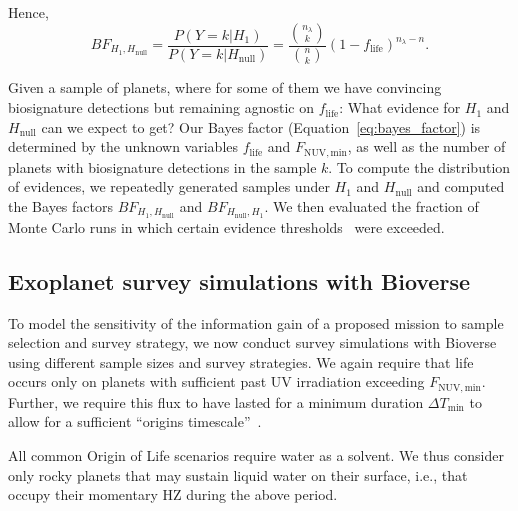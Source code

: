 \documentclass[modern,linenumbers]{aastex631}
\begin{document}
Hence,
\begin{equation}\label{eq:bayes_factor}
BF_{H_1,H_\mathrm{null}} = \frac{P(Y=k|H_1)}{P(Y=k|H_\mathrm{null})} = \frac{\binom{n_\lambda}{k}}{\binom{n}{k}}(1-f_\mathrm{life})^{n_{\lambda}-n}.
\end{equation}


Given a sample of planets, where for some of them we have convincing biosignature detections but remaining agnostic on $f_\mathrm{life}$: What evidence for $H_\mathrm{1}$ and $H_\mathrm{null}$ can we expect to get?
Our Bayes factor (Equation~\ref{eq:bayes_factor}) is determined by the unknown variables $f_\mathrm{life}$ and $F_\mathrm{NUV, min}$, as well as the number of planets with biosignature detections in the sample $k$.
To compute the distribution of evidences, we repeatedly generated samples under $H_\mathrm{1}$ and $H_\mathrm{null}$ and computed the Bayes factors $BF_{H_1,H_\mathrm{null}}$ and $BF_{H_\mathrm{null}, H_1}$.
We then evaluated the fraction of Monte Carlo runs in which certain evidence thresholds~\citep{Jeffreys1939} were exceeded.








\subsection{Exoplanet survey simulations with Bioverse}
To model the sensitivity of the information gain of a proposed mission to sample selection and survey strategy, we now conduct survey simulations with Bioverse using different sample sizes and survey strategies.
We again require that life occurs only on planets with sufficient past UV irradiation exceeding $F_\mathrm{NUV, min}$.
Further, we require this flux to have lasted for a minimum duration $\Delta T_\mathrm{min}$ to allow for a sufficient ``origins timescale''~\citep{Rimmer2023}.

All common Origin of Life scenarios require water as a solvent.
We thus consider only rocky planets that may sustain liquid water on their surface, i.e., that occupy their momentary \gls{HZ} during the above period.
\end{document}
